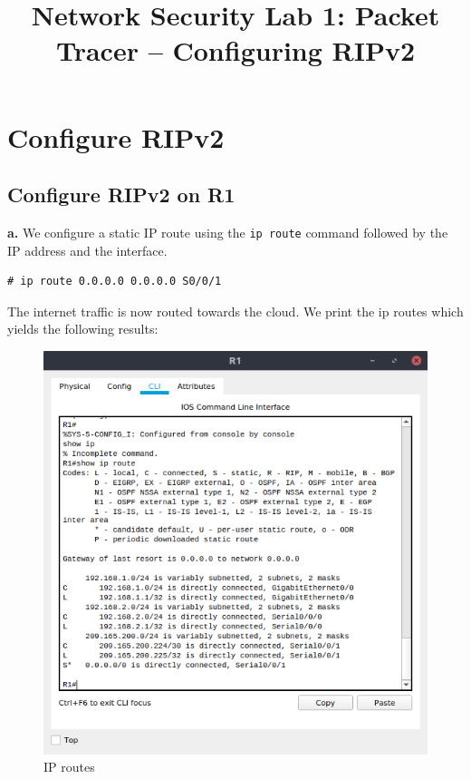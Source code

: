 \documentclass[conference]{IEEEtran}
\begin{document}
\title{Network Security Lab 1: Packet Tracer – Configuring RIPv2}

\author{
}

\maketitle

\section{Configure RIPv2}

\subsection{Configure RIPv2 on R1}

\textbf{a.} We configure a static IP route using the \texttt{ip route} command followed by the IP address and the interface.
\begin{verbatim}
# ip route 0.0.0.0 0.0.0.0 S0/0/1
\end{verbatim}
The internet traffic is now routed towards the cloud. We print the ip routes which yields the following results:
\begin{center}
\begin{figure}[h]
\includegraphics[scale=0.45]{../q01a.png}
\caption{IP routes}
\end{figure}
\end{center}
\end{document}
